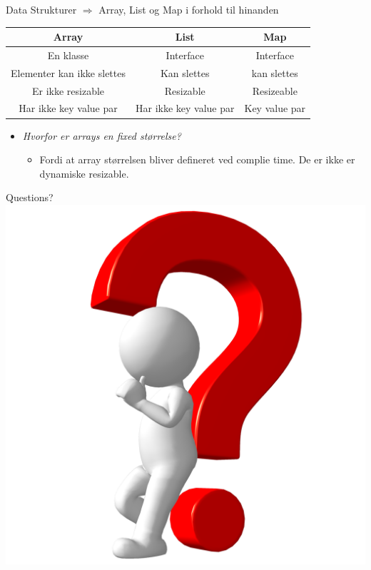 \documentclass[10pt,aspectratio=1610]{beamer}
\begin{document}
\begin{frame}[fragile]{Data Strukturer $\Rightarrow$ Array, List og Map i forhold til hinanden}
    \begin{center}
        \begin{tabular}{|c|c|c|}
            \hline
            Array & List & Map  \\ \hline
            En klasse   & Interface  & Interface \\ 
            Elementer kan ikke slettes & Kan slettes & kan slettes \\ 
            Er ikke resizable & Resizable & Resizeable \\ 
            Har ikke key value par & Har ikke key value par & Key value par\\ \hline
        \end{tabular}
        \begin{itemize}
            \item \textit{Hvorfor er arrays en fixed størrelse?}
            \begin{itemize}
                \item Fordi at array størrelsen bliver defineret ved complie time. De er ikke er dynamiske resizable.
            \end{itemize}
        \end{itemize}
    \end{center}
    
\end{frame}


\begin{frame}{Questions?}
            \includegraphics[width=\linewidth, height=\paperheight]{images/man-with-question-01.png}
\end{frame}
\end{document}

